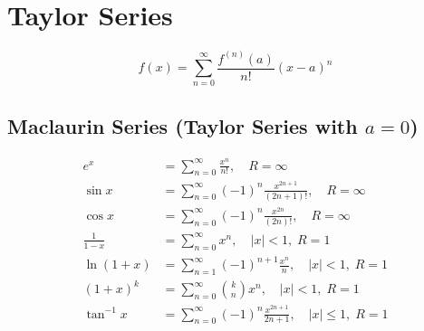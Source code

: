 \documentclass[11pt]{article}
\theoremstyle{mydef}
\begin{document}
\section*{Taylor Series}

\[
f(x)=\sum_{n=0}^{\infty}
\frac{f^{(n)}(a)}{n!}(x-a)^n
\]

\subsection*{Maclaurin Series (Taylor Series with $a=0$)}

\begin{align*}
e^x &= \sum_{n=0}^{\infty}\frac{x^n}{n!}, \quad R=\infty \\
\sin x &= \sum_{n=0}^{\infty}(-1)^n\frac{x^{2n+1}}{(2n+1)!}, \quad R=\infty \\
\cos x &= \sum_{n=0}^{\infty}(-1)^n\frac{x^{2n}}{(2n)!}, \quad R=\infty \\
\frac{1}{1-x} &= \sum_{n=0}^{\infty}x^n, \quad |x|<1,\; R=1 \\
\ln(1+x) &= \sum_{n=1}^{\infty}(-1)^{n+1}\frac{x^n}{n}, \quad |x|<1,\; R=1 \\
(1+x)^k &= \sum_{n=0}^{\infty} \binom{k}{n} x^n, \quad |x|<1,\; R=1 \\
\tan^{-1}x &= \sum_{n=0}^{\infty}(-1)^n \frac{x^{2n+1}}{2n+1}, \quad |x|\le 1,\; R=1
\end{align*}
\end{document}
